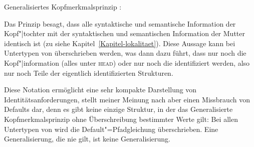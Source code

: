 \eas
Generalisiertes Kopfmerkmalsprinzip \citep[]{GSag2000a-u}:\\
 \impl
{}
\zs


\noindent
Das Prinzip besagt, dass alle syntaktische und semantische Information der Kopf"|tochter
mit der syntaktischen und semantischen Information der Mutter identisch ist (zu \synsem
siehe Kapitel~\ref{Kapitel-lokalitaet}). Diese Aussage kann bei Untertypen von  überschrieben werden,
was dann dazu führt, dass \zb nur noch die Kopf"|information (alles unter \textsc{head}) oder nur
noch die \compswe identifiziert werden, also nur noch Teile der eigentlich identifizierten
Strukturen.

Diese Notation ermöglicht eine sehr kompakte Darstellung von Identitätsanforderungen, stellt
meiner Meinung nach aber einen Missbrauch von Defaults dar, denn es gibt keine einzige Struktur,
in der das Generalisierte Kopfmerkmalsprinzip ohne Überschreibung bestimmter Werte gilt: Bei allen Untertypen von 
wird die Default"=Pfadgleichung überschrieben. Eine Generalisierung, die nie gilt, ist keine Generalisierung.


